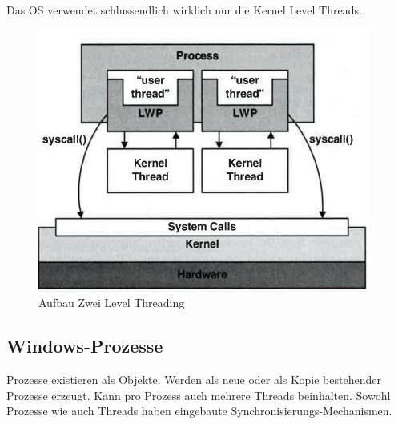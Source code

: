 Das OS verwendet schlussendlich wirklich nur die Kernel Level Threads. 

\begin{figure}[h!]
\centering
\includegraphics[width=0.7\linewidth]{fig/system-software-aufbau-2-level-threading}
\caption{Aufbau Zwei Level Threading}
\label{fig:system-software-aufbau-2-level-threading}
\end{figure}

\subsection{Windows-Prozesse}
Prozesse existieren als Objekte. Werden als neue oder als Kopie bestehender Prozesse erzeugt. Kann pro Prozess auch mehrere Threads beinhalten. Sowohl Prozesse wie auch Threads haben eingebaute Synchronisierungs-Mechanismen.